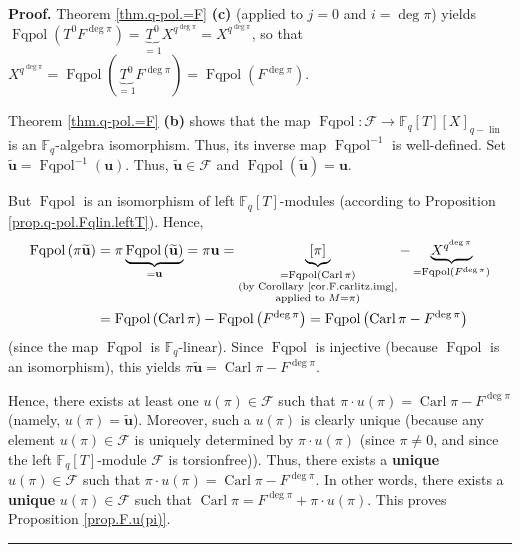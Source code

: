 \documentclass[numbers=enddot,12pt,final,onecolumn,notitlepage]{scrartcl}%
\theoremstyle{definition}
\newenvironment{proof}[1][Proof]{\noindent\textbf{#1.} }{\ \rule{0.5em}{0.5em}}
\begin{document}
\begin{proof}
Theorem \ref{thm.q-pol.=F} \textbf{(c)} (applied to $j=0$ and $i=\deg\pi$)
yields $\operatorname*{Fqpol}\left(  T^{0}F^{\deg\pi}\right)
=\underbrace{T^{0}}_{=1}X^{q^{\deg\pi}}=X^{q^{\deg\pi}}$, so that
$X^{q^{\deg\pi}}=\operatorname*{Fqpol}\left(  \underbrace{T^{0}}_{=1}%
F^{\deg\pi}\right)  =\operatorname*{Fqpol}\left(  F^{\deg\pi}\right)  $.

Theorem \ref{thm.q-pol.=F} \textbf{(b)} shows that the map
$\operatorname*{Fqpol}:\mathcal{F}\rightarrow\mathbb{F}_{q}\left[  T\right]
\left[  X\right]  _{q-\operatorname*{lin}}$ is an $\mathbb{F}_{q}$-algebra
isomorphism. Thus, its inverse map $\operatorname*{Fqpol}\nolimits^{-1}$ is
well-defined. Set $\widetilde{\mathbf{u}}=\operatorname*{Fqpol}\nolimits^{-1}%
\left(  \mathbf{u}\right)  $. Thus, $\widetilde{\mathbf{u}}\in\mathcal{F}$ and
$\operatorname*{Fqpol}\left(  \widetilde{\mathbf{u}}\right)  =\mathbf{u}$.

But $\operatorname*{Fqpol}$ is an isomorphism of left $\mathbb{F}_{q}\left[
T\right]  $-modules (according to Proposition \ref{prop.q-pol.Fqlin.leftT}).
Hence,%
\begin{align*}
\operatorname*{Fqpol}\left(  \pi\widetilde{\mathbf{u}}\right)   &
=\pi\underbrace{\operatorname*{Fqpol}\left(  \widetilde{\mathbf{u}}\right)
}_{=\mathbf{u}}=\pi\mathbf{u}=\underbrace{\left[  \pi\right]  }%
_{\substack{=\operatorname*{Fqpol}\left(  \operatorname*{Carl}\pi\right)
\\\text{(by Corollary \ref{cor.F.carlitz.img},}\\\text{applied to }%
M=\pi\text{)}}}-\underbrace{X^{q^{\deg\pi}}}_{=\operatorname*{Fqpol}\left(
F^{\deg\pi}\right)  }\\
&  =\operatorname*{Fqpol}\left(  \operatorname*{Carl}\pi\right)
-\operatorname*{Fqpol}\left(  F^{\deg\pi}\right)  =\operatorname*{Fqpol}%
\left(  \operatorname*{Carl}\pi-F^{\deg\pi}\right)
\end{align*}
(since the map $\operatorname*{Fqpol}$ is $\mathbb{F}_{q}$-linear). Since
$\operatorname*{Fqpol}$ is injective (because $\operatorname*{Fqpol}$ is an
isomorphism), this yields $\pi\widetilde{\mathbf{u}}=\operatorname*{Carl}%
\pi-F^{\deg\pi}$.

Hence, there exists at least one $u\left(  \pi\right)  \in\mathcal{F}$ such
that $\pi\cdot u\left(  \pi\right)  =\operatorname*{Carl}\pi-F^{\deg\pi}$
(namely, $u\left(  \pi\right)  =\widetilde{\mathbf{u}}$). Moreover, such a
$u\left(  \pi\right)  $ is clearly unique (because any element $u\left(
\pi\right)  \in\mathcal{F}$ is uniquely determined by $\pi\cdot u\left(
\pi\right)  $ (since $\pi\neq0$, and since the left $\mathbb{F}_{q}\left[
T\right]  $-module $\mathcal{F}$ is torsionfree)). Thus, there exists a
\textbf{unique} $u\left(  \pi\right)  \in\mathcal{F}$ such that $\pi\cdot
u\left(  \pi\right)  =\operatorname*{Carl}\pi-F^{\deg\pi}$. In other words,
there exists a \textbf{unique} $u\left(  \pi\right)  \in\mathcal{F}$ such that
$\operatorname*{Carl}\pi=F^{\deg\pi}+\pi\cdot u\left(  \pi\right)  $. This
proves Proposition \ref{prop.F.u(pi)}.
\end{proof}
\end{document}

